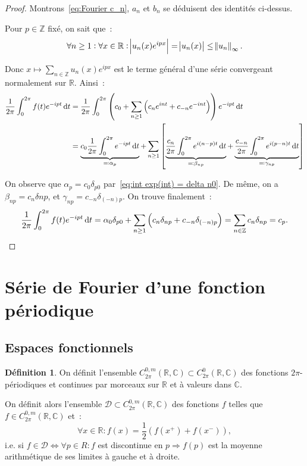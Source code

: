 \documentclass{report}
\theoremstyle{definition}
\newtheorem{déf}[thm]{Définition}
\theoremstyle{remark}
\numberwithin{equation}{section}
\newcommand{\C}{\mathbb C}
\newcommand{\R}{\mathbb R}
\newcommand{\Z}{\mathbb Z}
\newcommand{\CzmT}[1]{C^{0,m}_{#1}}
\newcommand{\Czm}{\CzmT{2\pi}}
\begin{document}
			\begin{proof} Montrons~\eqref{eq:Fourier c_n}, $a_n$ et $b_n$ se déduisent des identités ci-dessus.

			Pour $p \in \Z$ fixé, on sait que~:
			\begin{equation}
				\forall n \geq 1 : \forall x \in \R : \abs {u_n(x)e^{ipx}} = \abs {u_n(x)} \leq \norm {u_n}_\infty.
			\end{equation}

			Donc $x \mapsto \sum_{n \in \Z}u_n(x)e^{ipx}$ est le terme général d'une série convergeant normalement sur $\R$. Ainsi~:
			\begin{align}
				\frac 1{2\pi} \int_0^{2\pi}f(t)e^{-ipt}\dif t &= \frac 1{2\pi}\int_0^{2\pi}\left(c_0 + \sum_{n \geq 1}\left(c_ne^{int} + c_{-n}e^{-int}\right)\right)e^{-ipt}\dif t \\
					&= \underbrace {c_0\frac 1{2\pi}\int_0^{2\pi}e^{-ipt}\dif t}_{\eqqcolon \alpha_p}
						+ \sum_{n \geq 1}\left[\underbrace {\frac {c_n}{2\pi}\int_0^{2\pi}e^{i(n-p)t}\dif t}_{\eqqcolon \beta_{np}}
							+ \underbrace {\frac {c_{-n}}{2\pi}\int_0^{2\pi}e^{i(p-n)t}\dif t}_{\eqqcolon \gamma_{np}}\right]
			\end{align}

			On observe que $\alpha_p = c_0\delta_{p0}$ par~\eqref{eq:int exp(int) = delta n0}. De même, on a $\beta_{np} = c_n\delta{np}$, et $\gamma_{np}
				= c_{-n}\delta_{(-n)p}$.
			On trouve finalement~:
			\begin{equation}
				\frac 1{2\pi}\int_0^{2\pi}f(t)e^{-ipt}\dif t = \alpha_0\delta_{p0} + \sum_{n \geq 1}\left(c_n\delta_{np} + c_{-n}\delta_{(-n)p}\right)
					= \sum_{n \in \Z}c_n\delta_{np} = c_p.
			\end{equation}
			\end{proof}

	\section{Série de Fourier d'une fonction périodique}
		\subsection{Espaces fonctionnels}
			\begin{déf} On définit l'ensemble $\Czm(\R, \C) \subset C^0_{2\pi}(\R, \C)$ des fonctions $2\pi$-périodiques et continues par morceaux sur $\R$ et
			à valeurs dans $\C$.

			On définit alors l'ensemble $\mathcal D \subset \Czm(\R, \C)$ des fonctions $f$ telles que $f \in \Czm(\R, \C)$ et~:
			\begin{equation}
				\forall x \in \R : f(x) = \frac 12(f(x^+)+f(x^-)),
			\end{equation}
			i.e. si $f \in \mathcal D \iff \forall p \in R : f$ est discontinue en $p \Rightarrow f(p)$ est la moyenne arithmétique de ses limites à gauche et à droite.
			\end{déf}
\end{document}

